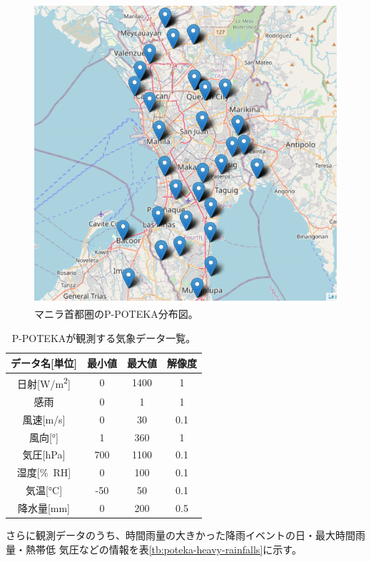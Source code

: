 \begin{figure}[H]
\begin{center}
\includegraphics[width=0.8\linewidth]{fig/methodologies/poteka-distribution-map.png}
\captionsetup{width=0.8\linewidth}
\caption{マニラ首都圏のP-POTEKA分布図。}
\label{fig:poteka-distribution-map}
\end{center}
\end{figure}


\begin{table}[H]
\centering
\begin{tabular}{cccc}
\hline
データ名[単位] & 最小値 & 最大値 & 解像度 \\
\hline \hline
日射[\si{W/m^{2}}] & 0 & 1400 & 1 \\
感雨 & 0 & 1 & 1 \\
風速[\si{m/s}] & 0 & 30 & 0.1 \\
風向[\si{\degree}] & 1 & 360 & 1 \\
気圧[\si{hPa}] & 700 & 1100 & 0.1 \\
湿度[\si{\%RH}] & 0 & 100 & 0.1 \\
気温[\si{\degreeCelsius}] & -50 & 50 & 0.1 \\
降水量[\si{mm}] & 0 & 200 & 0.5 \\
\hline
\end{tabular}
\caption{P-POTEKAが観測する気象データ一覧。}
\label{tb:poteka-observation-parameters}
\end{table}

さらに観測データのうち、時間雨量の大きかった降雨イベントの日・最大時間雨量・熱帯低
気圧などの情報を表\ref{tb:poteka-heavy-rainfalls}に示す。

